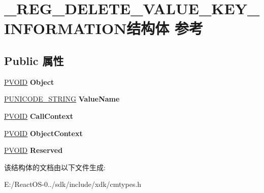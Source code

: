 \hypertarget{struct___r_e_g___d_e_l_e_t_e___v_a_l_u_e___k_e_y___i_n_f_o_r_m_a_t_i_o_n}{}\section{\+\_\+\+R\+E\+G\+\_\+\+D\+E\+L\+E\+T\+E\+\_\+\+V\+A\+L\+U\+E\+\_\+\+K\+E\+Y\+\_\+\+I\+N\+F\+O\+R\+M\+A\+T\+I\+O\+N结构体 参考}
\label{struct___r_e_g___d_e_l_e_t_e___v_a_l_u_e___k_e_y___i_n_f_o_r_m_a_t_i_o_n}
\subsection*{Public 属性}
\begin{DoxyCompactItemize}
\item 
\mbox{\label{struct___r_e_g___d_e_l_e_t_e___v_a_l_u_e___k_e_y___i_n_f_o_r_m_a_t_i_o_n_ad8622d39d1492f5bb8f9ef5685e041f3}} 
\hyperlink{interfacevoid}{P\+V\+O\+ID} {\bfseries Object}
\item 
\mbox{\label{struct___r_e_g___d_e_l_e_t_e___v_a_l_u_e___k_e_y___i_n_f_o_r_m_a_t_i_o_n_ad78d5ff6258e6eee1dd512c4e8be6f50}} 
\hyperlink{struct___u_n_i_c_o_d_e___s_t_r_i_n_g}{P\+U\+N\+I\+C\+O\+D\+E\+\_\+\+S\+T\+R\+I\+NG} {\bfseries Value\+Name}
\item 
\mbox{\label{struct___r_e_g___d_e_l_e_t_e___v_a_l_u_e___k_e_y___i_n_f_o_r_m_a_t_i_o_n_aa21a137da07b953604642c770ccb9c76}} 
\hyperlink{interfacevoid}{P\+V\+O\+ID} {\bfseries Call\+Context}
\item 
\mbox{\label{struct___r_e_g___d_e_l_e_t_e___v_a_l_u_e___k_e_y___i_n_f_o_r_m_a_t_i_o_n_abc03281dd161083b6dd2a659627fc185}} 
\hyperlink{interfacevoid}{P\+V\+O\+ID} {\bfseries Object\+Context}
\item 
\mbox{\label{struct___r_e_g___d_e_l_e_t_e___v_a_l_u_e___k_e_y___i_n_f_o_r_m_a_t_i_o_n_aba6215ddeb355e1faf77414d1d823951}} 
\hyperlink{interfacevoid}{P\+V\+O\+ID} {\bfseries Reserved}
\end{DoxyCompactItemize}


该结构体的文档由以下文件生成\+:\begin{DoxyCompactItemize}
\item 
E\+:/\+React\+O\+S-\/0../sdk/include/xdk/cmtypes.\+h\end{DoxyCompactItemize}
